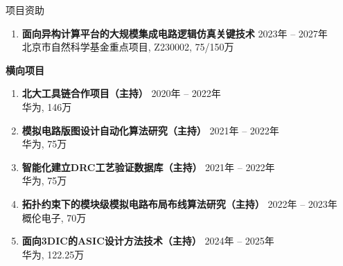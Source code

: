 \begin{rSection}{项目资助}
\begin{enumerate}[font=\normalfont]
\item 
{\bf 面向异构计算平台的大规模集成电路逻辑仿真关键技术 } \hfill{ 2023年 -- 2027年} \\
北京市自然科学基金重点项目, Z230002, 75/150万 %

\end{enumerate}
    
\textbf{横向项目}
        
\begin{enumerate}[font=\normalfont]

\item 
{\bf 北大工具链合作项目（主持） } \hfill{ 2020年 -- 2022年} \\
华为, 146万

\item 
{\bf 模拟电路版图设计自动化算法研究（主持） } \hfill{ 2021年 -- 2022年} \\
华为, 75万

\item 
{\bf 智能化建立DRC工艺验证数据库（主持） } \hfill{ 2021年 -- 2022年} \\
华为, 75万

\item 
{\bf 拓扑约束下的模块级模拟电路布局布线算法研究（主持） } \hfill{ 2022年 -- 2023年} \\
概伦电子, 70万

\item 
{\bf 面向3DIC的ASIC设计方法技术（主持） } \hfill{ 2024年 -- 2025年} \\
华为, 122.25万

\end{enumerate}

\end{rSection}
